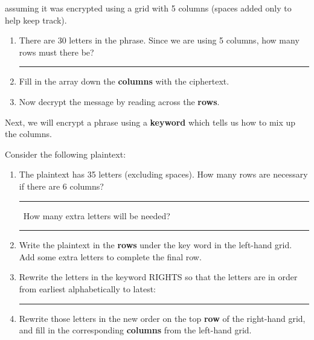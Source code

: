 \documentclass[12pt]{article}
\renewcommand{\emph}[1]{\textsf{\textbf{#1}}}
\newcommand{\ans}[1][1in]{\rule{#1}{.5pt}}
\newcommand{\be}{\begin{enumerate}}
\newcommand{\ee}{\end{enumerate}}
\begin{document}
\begin{enumerate}
assuming it was encrypted using a grid with 5 columns (spaces added only to help keep track).
\be
\item There are 30 letters in the phrase. Since we are using 5 columns, how many rows must there be? \ans

\item Fill in the array down the \emph{columns} with the ciphertext.
\begin{center}
\end{center}


\item Now decrypt the message by reading across the \emph{rows}.

\vfill
\ee

\ee

\newpage

\item Next, we will encrypt a phrase using a  \emph{keyword} which tells us how to mix up the columns.

Consider the following plaintext:


\be
\item The plaintext has 35 letters (excluding spaces). How many rows are necessary if there are 6 columns? \ans \ How many extra letters will be needed? \ans

\item Write the plaintext in the \emph{rows} under the key word in the left-hand grid.  Add some extra letters to complete the final row.

\item Rewrite the letters in the keyword RIGHTS so that the letters are in order from earliest alphabetically to latest: \ans[2in]

\item Rewrite those letters in the new order on the top \emph{row} of the right-hand grid, and fill in the corresponding \emph{columns} from the left-hand grid.

\begin{center}
\hspace{2cm}
\end{center}


\end{enumerate}
\end{document}
